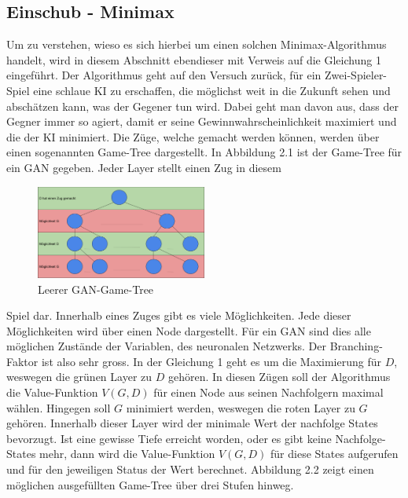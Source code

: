 \subsection{Einschub - Minimax}
Um zu verstehen, wieso es sich hierbei um einen solchen Minimax-Algorithmus handelt, wird in diesem Abschnitt ebendieser mit
Verweis auf die Gleichung 1 eingeführt. Der Algorithmus geht auf den Versuch zurück, für ein Zwei-Spieler-Spiel eine
schlaue KI zu erschaffen, die möglichst weit in die Zukunft sehen und abschätzen kann, was der Gegener tun wird.
Dabei geht man davon aus, dass der Gegner immer so agiert, damit er seine Gewinnwahrscheinlichkeit maximiert und die
der KI minimiert.\cite{towardsdatascience:minimax} Die Züge, welche gemacht werden können, werden über einen sogenannten
Game-Tree dargestellt. In Abbildung 2.1 ist der Game-Tree für ein \Gls{GAN} gegeben. Jeder Layer stellt einen Zug in diesem
\begin{figure}[h!]
    \begin{center}
        \includegraphics[width=0.5\textwidth]{../common/02_main/resources/03_gan_game_tree.png}
    \end{center}
    \caption{Leerer GAN-Game-Tree}
    \label{fig:Leerer GAN-Game-Tree}
\end{figure}
Spiel dar. Innerhalb eines Zuges gibt es viele Möglichkeiten. Jede dieser Möglichkeiten wird über einen Node dargestellt.
Für ein \Gls{GAN} sind dies alle möglichen Zustände der Variablen, des neuronalen Netzwerks. Der Branching-Faktor ist also
sehr gross. In der Gleichung 1 geht es um die Maximierung für $D$, weswegen die grünen Layer zu $D$ gehören. In diesen Zügen
soll der Algorithmus die Value-Funktion $V(G,D)$ für einen Node aus seinen Nachfolgern maximal wählen. Hingegen soll $G$ minimiert werden, weswegen
die roten Layer zu $G$ gehören. Innerhalb dieser Layer wird der minimale Wert der nachfolge States bevorzugt. Ist eine gewisse
Tiefe erreicht worden, oder es gibt keine Nachfolge-States mehr, dann wird die Value-Funktion $V(G,D)$ für diese States aufgerufen und für den
jeweiligen Status der Wert berechnet. Abbildung 2.2 zeigt einen möglichen ausgefüllten Game-Tree über drei Stufen hinweg.
